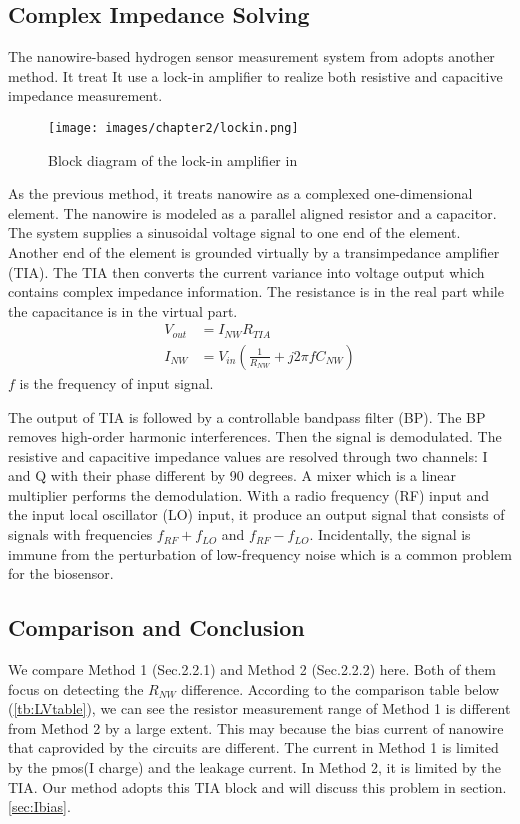 \subsection{Complex Impedance Solving}
The nanowire-based hydrogen sensor measurement system from \cite{Jlockin} adopts another method.
It treat
It use a lock-in amplifier to realize both resistive and capacitive impedance measurement.

\begin{figure}[!htbp]
        \centering
        \texttt{[image: images/chapter2/lockin.png]}
        \caption{Block diagram of the lock-in amplifier in \cite{Jlockin}}
        \label{fig:lockin}
\end{figure}

As the previous method, it treats nanowire as a complexed one-dimensional element. The nanowire is modeled as a parallel aligned resistor and a capacitor.
The system supplies a sinusoidal voltage signal to one end of the element.
Another end of the element is grounded virtually by a transimpedance amplifier (TIA).
The TIA then converts the current variance into voltage output which contains complex impedance information.
The resistance is in the real part while the capacitance is in the virtual part.
\setlength{\mathindent}{5.5cm}
\begin{align}
    V_{out} &= I_{NW}R_{TIA} \\
    I_{NW} &= V_{in}(\frac{1}{R_{NW}} + j 2\pi fC_{NW})
\end{align}
$f$ is the frequency of input signal.

The output of TIA is followed by a controllable bandpass filter (BP).
The BP removes high-order harmonic interferences.
Then the signal is demodulated.
The resistive and capacitive impedance values are resolved through two channels: I and Q with their phase different by 90 degrees.
A mixer which is a linear multiplier performs the demodulation.
With a radio frequency (RF) input and the input local oscillator (LO) input, it produce an output signal that consists of signals with frequencies $f_{RF} + f_{LO}$ and $f_{RF} - f_{LO}$.
Incidentally, the signal is immune from the perturbation of low-frequency noise which is a common problem for the biosensor.

\subsection{Comparison and Conclusion} \label{sec:ch2CC}
We compare Method 1 (Sec.2.2.1) and Method 2 (Sec.2.2.2) here.
Both of them focus on detecting the $R_{NW}$ difference.
According to the comparison table below (\ref{tb:LVtable}), we can see the resistor measurement range of Method 1 is different from Method 2 by a large extent.
This may because the bias current of nanowire that caprovided by the circuits are different.
The current in Method 1 is limited by the pmos(I charge) and the leakage current.
In Method 2, it is limited by the TIA.
Our method adopts this TIA block and will discuss this problem in section.\ref{sec:Ibias}.

